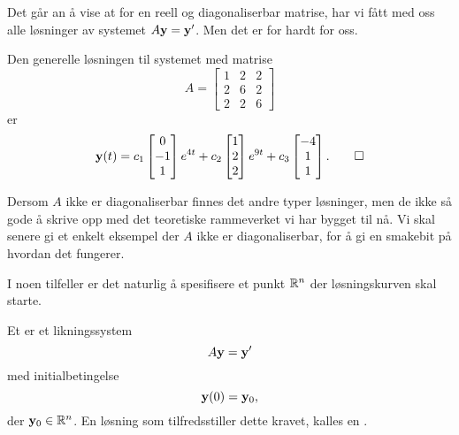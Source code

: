 \begin{kommentarx}
Det går an å vise at for en reell og diagonaliserbar matrise, har vi fått med oss alle løsninger av systemet $A\mathbf{y}=\mathbf{y}'$. Men det er for hardt for oss.
\end{kommentarx}


\begin{ex}
Den generelle løsningen til systemet med matrise
\[
A=
\begin{bmatrix}
1 & 2 & 2\\  2 &6 & 2 \\ 2 & 2 & 6
\end{bmatrix}
\]
er
\[
\mathbf{y}(t)=
c_1
\begin{bmatrix}
0 \\ -1 \\ 1
\end{bmatrix} e^{4t}
+
c_2
\begin{bmatrix}
1 \\ 2 \\ 2
\end{bmatrix}e^{9t}
+
c_3
\begin{bmatrix}
-4 \\ 1 \\ 1
\end{bmatrix}. \qedhere
\]
\end{ex}

\begin{kommentarx}
Dersom $A$ ikke er diagonaliserbar finnes det andre typer løsninger, 
men de ikke så gode å skrive opp med det teoretiske rammeverket vi har bygget til nå. 
Vi skal senere gi et enkelt eksempel der $A$ ikke er diagonaliserbar, for å gi en smakebit på hvordan det fungerer.
\end{kommentarx}


I noen tilfeller er det naturlig å spesifisere et punkt $\mathbb{R}^n$ der løsningskurven skal starte. 

\begin{defnx}
Et  er et likningssystem
\[
A\mathbf{y}=\mathbf{y}'
\]
med initialbetingelse
\[
\mathbf{y}(0)=\mathbf{y}_0,
\]
der $\mathbf{y}_0 \in \mathbb{R}^n$. En løsning som tilfredsstiller dette kravet, kalles en .
\end{defnx}


